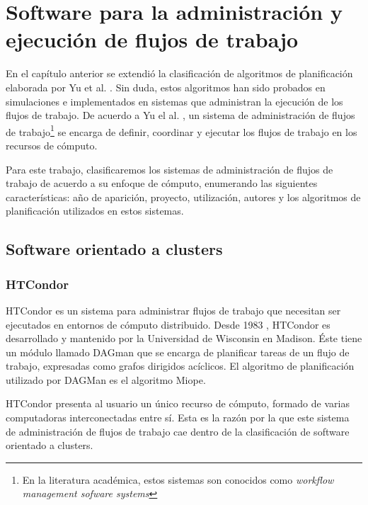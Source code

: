 \chapter[Software para flujos de trabajo]{Software para la administración y ejecución de flujos de trabajo}

En el capítulo anterior se extendió la clasificación de algoritmos de planificación elaborada por Yu et al. \cite{yu2008workflow}. Sin duda, estos algoritmos han sido probados en simulaciones e implementados en sistemas que administran la ejecución de los flujos de trabajo. De acuerdo a Yu el al. \cite{yu2008workflow}, un sistema de administración de flujos de trabajo\footnote{En la literatura académica, estos sistemas son conocidos como \emph{workflow management sofware systems}} se encarga de definir, coordinar y ejecutar los flujos de trabajo en los recursos de cómputo.

Para este trabajo, clasificaremos los sistemas de administración de flujos de trabajo de acuerdo a su enfoque de cómputo, enumerando las siguientes características: año de aparición, proyecto, utilización, autores y los algoritmos de planificación utilizados en estos sistemas.

\section{Software orientado a clusters}


\subsection{HTCondor}

HTCondor \cite{condor-practice} es un sistema para administrar flujos de trabajo que necesitan ser ejecutados en entornos de cómputo distribuido. Desde 1983 \cite{htcondor2014webpage}, HTCondor es desarrollado y mantenido por la Universidad de Wisconsin en Madison. Éste tiene un módulo llamado DAGman que se encarga de planificar tareas de un flujo de trabajo, expresadas como grafos dirigidos acíclicos. El algoritmo de planificación utilizado por DAGMan es el algoritmo Miope. 

HTCondor presenta al usuario un único recurso de cómputo, formado de varias computadoras interconectadas entre sí. Esta es la razón por la que este sistema de administración de flujos de trabajo cae dentro de la clasificación de software orientado a clusters.

